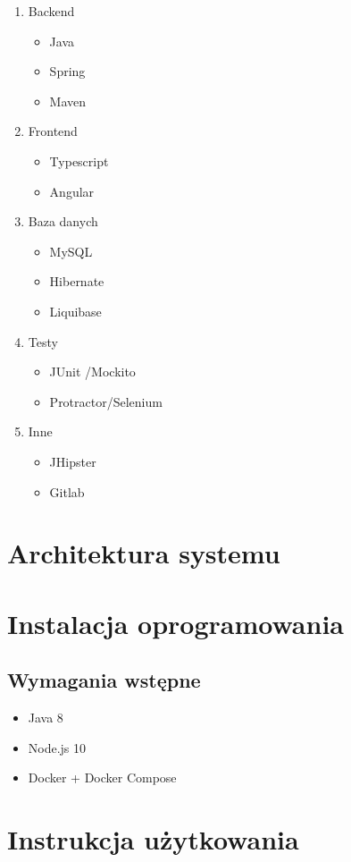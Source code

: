 \begin{enumerate}
    \item Backend
    \begin{itemize}
        \item Java \cite{java}
        \item Spring \cite{spring}
        \item Maven \cite{maven}
    \end{itemize}

    \item Frontend
    \begin{itemize}
        \item Typescript \cite{typescript}
        \item Angular \cite{angular}
    \end{itemize}

    \item Baza danych
    \begin{itemize}
        \item MySQL \cite{mysql}
        \item Hibernate \cite{hibernate}
        \item Liquibase \cite{liquibase}
    \end{itemize}

    \item Testy
    \begin{itemize}
        \item JUnit \cite{junit} /Mockito
        \item Protractor/Selenium
    \end{itemize}

    \item Inne
    \begin{itemize}
        \item JHipster
        \item Gitlab
    \end{itemize}
\end{enumerate}
\section{Architektura systemu}
\section{Instalacja oprogramowania}
\subsection{Wymagania wstępne}
\begin{itemize}
    \item Java 8 \cite{java}
    \item Node.js 10 \cite{nodejs}
    \item Docker + Docker Compose
\end{itemize}
\section{Instrukcja użytkowania}
\thispagestyle{normal}
